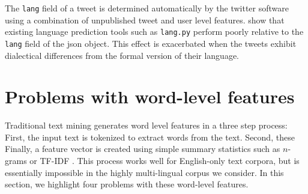 \documentclass[sigconf,10pt]{acmart}
\newcommand{\str}[1]{\texttt{#1}}
\begin{document}
The \str{lang} field of a tweet is determined automatically by the twitter software using a combination of unpublished tweet and user level features.
\citet{blodgett2016demographic} show that existing language prediction tools such as \str{lang.py} \citep{lui2012langid} perform poorly relative to the \str{lang} field of the json object.
This effect is exacerbated when the tweets exhibit dialectical differences from the formal version of their language.

%

\section{Problems with word-level features}

%

Traditional text mining generates word level features in a three step process:
First, the input text is tokenized to extract words from the text.
Second, these 
Finally, a feature vector is created using simple summary statistics such as $n$-grams or TF-IDF \citep{}.
This process works well for English-only text corpora,
but is essentially impossible in the highly multi-lingual corpus we consider.
In this section, we highlight four problems with these word-level features.
\end{document}
